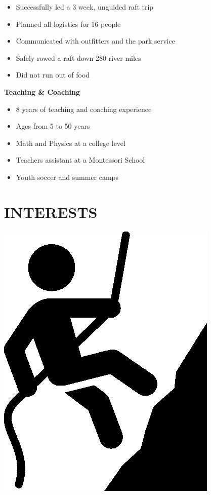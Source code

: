 \documentclass[12pt]{resume}
\begin{document}
\begin{minipage}[t]{0.48\textwidth}
\begin{itemize}
                \setlength\itemsep{.2em}
                \item {Successfully led a 3 week, unguided raft trip}
                \item{Planned all logistics for 16 people}
                \item{Communicated with outfitters and the park service}
                \item {Safely rowed a raft down 280 river miles}
                \item {Did not run out of food}
            \end{itemize}
            \vspace{1.5mm}
            {\par \bf Teaching \& Coaching}
            \vspace{.05mm}
            \begin{itemize}
                \setlength\itemsep{.2em}
                \item {8 years of teaching and coaching experience}
                \item{Ages from 5 to 50 years}
                \item{Math and Physics at a college level}
                \item {Teachers assistant at a Montessori School}
                \item {Youth soccer and summer camps}
            \end{itemize}
            \vspace{-7mm}
        {\section* {INTERESTS}}
    \begin{minipage}[t]{0.1\textwidth}
        {\par \includegraphics[scale=.1]{climber}}\\

\end{minipage}
\end{minipage}
\end{document}
